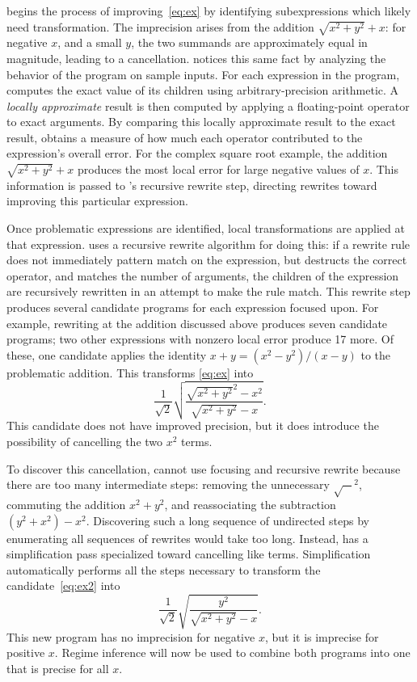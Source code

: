 \documentclass[paper.tex]{subfiles}
\begin{document}
\casio begins the process of improving~\eqref{eq:ex}
  by identifying subexpressions
  which likely need transformation.
The imprecision arises from the addition $\sqrt{x^2 + y^2} + x$:
  for negative $x$, and a small $y$,
  the two summands are approximately equal in magnitude,
  leading to a cancellation.
\casio notices this same fact
  by analyzing the behavior of the program on sample inputs.
For each expression in the program,
  \casio computes the exact value of its children
  using arbitrary-precision arithmetic.
A \emph{locally approximate} result is then computed
  by applying a floating-point operator to exact arguments.
By comparing this locally approximate result to the exact result,
  \casio obtains a measure of how much each operator
  contributed to the expression's overall error.
For the complex square root example,
  the addition $\sqrt{x^2 + y^2} + x$ produces the most local error
  for large negative values of $x$.
This information is passed to \casio's recursive rewrite step,
  directing rewrites toward improving this particular expression.

Once problematic expressions are identified,
  local transformations are applied at that expression.
\casio uses a recursive rewrite algorithm for doing this:
  if a rewrite rule does not immediately pattern match on the expression,
  but destructs the correct operator,
  and matches the number of arguments,
  the children of the expression are recursively rewritten
  in an attempt to make the rule match.
This rewrite step produces several candidate programs
  for each expression focused upon.
For example, rewriting at the addition discussed above
  produces seven candidate programs;
  two other expressions with nonzero local error produce 17 more.
Of these, one candidate applies the identity
  $x + y = (x^2 - y^2) / (x - y)$ to the problematic addition.
This transforms \eqref{eq:ex} into
\begin{equation} \label{eq:ex2}
  \frac1{\sqrt2} \sqrt{\frac{\sqrt{x^2 + y^2}^2 - x^2}{\sqrt{x^2 + y^2} - x}}.
\end{equation}
This candidate does not have improved precision,
  but it does introduce the possibility
  of cancelling the two $x^2$ terms.

To discover this cancellation,
  \casio cannot use focusing and recursive rewrite
  because there are too many intermediate steps:
  removing the unnecessary $\sqrt{-}^2$,
  commuting the addition $x^2 + y^2$,
  and reassociating the subtraction $(y^2 + x^2) - x^2$.
Discovering such a long sequence of undirected steps
  by enumerating all sequences of rewrites
  would take too long.
Instead, \casio has a simplification pass
  specialized toward cancelling like terms.
Simplification automatically performs all the steps necessary
  to transform the candidate~\eqref{eq:ex2} into
\begin{equation} \label{eq:ex3}
  \frac1{\sqrt2} \sqrt{\frac{y^2}{\sqrt{x^2 + y^2} - x}}.
\end{equation}
This new program has no imprecision for negative $x$,
  but it is imprecise for positive $x$.
Regime inference will now be used to combine both programs
  into one that is precise for all $x$.
\end{document}
